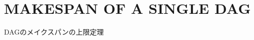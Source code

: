 
\section{MAKESPAN OF A SINGLE DAG}
\label{sec: MAKESPAN OF A SINGLE DAG}

\begin{frame}{DAGのメイクスパンの上限定理}
\end{frame}
